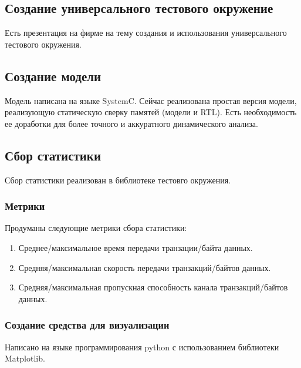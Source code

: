 \subsection{Создание универсального тестового окружение}

Есть презентация на фирме на тему создания и использования универсального тестового окружения.

\subsection{Создание модели}

Модель написана на языке SystemC. Сейчас реализована простая версия модели, реализующую статическую сверку памятей (модели и RTL). Есть необходимость ее доработки для более точного и аккуратного динамического анализа.

\subsection{Сбор статистики}

Сбор статистики реализован в библиотеке тестовго окружения.

\subsubsection{Метрики}

Продуманы следующие метрики сбора статистики:

\begin{enumerate}
  \item Среднее/максимальное время передачи транзации/байта данных.
  \item Средняя/максимальная скорость передачи транзакций/байтов данных.
  \item Средняя/максимальная пропускная способность канала транзакций/байтов данных.
\end{enumerate}

\subsubsection{Создание средства для визуализации}

Написано на языке программирования python с использованием библиотеки Matplotlib.

\clearpage

